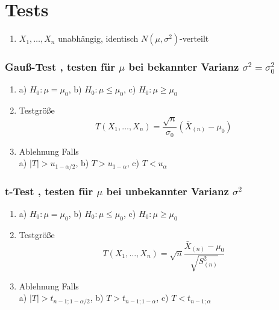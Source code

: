\documentclass[
ngerman,
accentcolor=9c,%
type=intern,
marginpar=false
]{tudapub}
\begin{document}
    \newpage
    \section{Tests}
        \begin{enumerate}
            \item $X_1,\dots,X_n$ unabhängig, identisch $N(\mu, \sigma^2)$-verteilt
        \end{enumerate}
        \subsubsection*{Gauß-Test , testen für $\mu$ bei bekannter Varianz $\sigma^2 = \sigma_0^2$}
            \begin{enumerate}
                \item a) $H_0: \mu = \mu_0$, b) $H_0: \mu \leq \mu_0$, c) $H_0: \mu \geq \mu_0$
                \item Testgröße
                \begin{equation*}
                    T(X_1,\dots,X_n)=\dfrac{\sqrt{n}}{\sigma_0}(\bar{X}_{(n)}-\mu_0)
                \end{equation*}
                \item Ablehnung Falls\\
                a) $|T| > u_{1-\alpha/2}$, b) $T > u_{1-\alpha}$, c) $T < u_{\alpha}$
            \end{enumerate}
        \subsubsection*{t-Test , testen für $\mu$ bei unbekannter Varianz $\sigma^2$}
            \begin{enumerate}
                \item a) $H_0: \mu = \mu_0$, b) $H_0: \mu \leq \mu_0$, c) $H_0: \mu \geq \mu_0$
                \item Testgröße
                \begin{equation*}
                    T(X_1,\dots,X_n)=\sqrt{n}\dfrac{\bar{X}_{(n)}-\mu_0}{\sqrt{S_{(n)}^2}}
                \end{equation*}
                \item Ablehnung Falls\\
                a) $|T| > t_{n-1;1-\alpha/2}$, b) $T > t_{n-1;1-\alpha}$, c) $T < t_{n-1;\alpha}$
            \end{enumerate}
\end{document}
